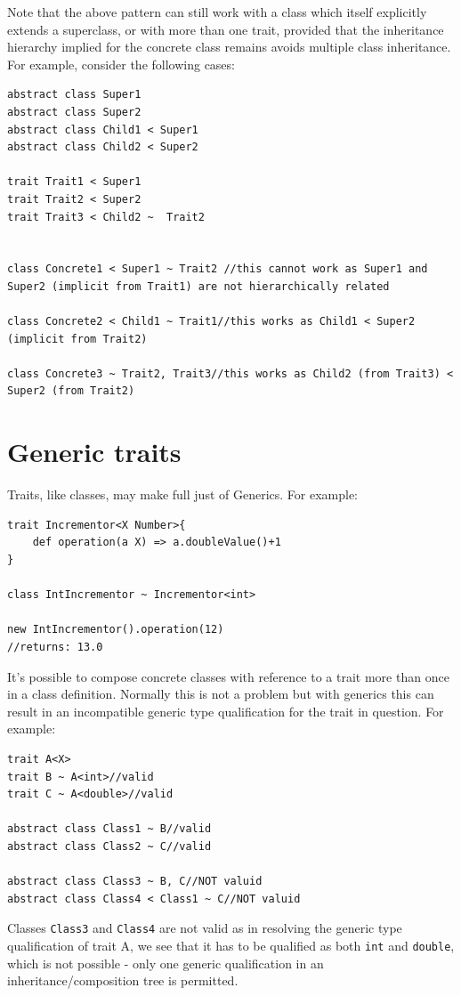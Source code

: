 \documentclass[conc-doc]{subfiles}
\begin{document}
Note that the above pattern can still work with a class which itself explicitly extends a superclass, or with more than one trait, provided that the inheritance hierarchy implied for the concrete class remains avoids multiple class inheritance. For example, consider the following cases:
\begin{lstlisting}
abstract class Super1
abstract class Super2
abstract class Child1 < Super1
abstract class Child2 < Super2

trait Trait1 < Super1
trait Trait2 < Super2
trait Trait3 < Child2 ~  Trait2


class Concrete1 < Super1 ~ Trait2 //this cannot work as Super1 and Super2 (implicit from Trait1) are not hierarchically related 

class Concrete2 < Child1 ~ Trait1//this works as Child1 < Super2 (implicit from Trait2)

class Concrete3 ~ Trait2, Trait3//this works as Child2 (from Trait3) < Super2 (from Trait2) 
\end{lstlisting}

\section{Generic traits}
Traits, like classes, may make full just of Generics. For example:
\begin{lstlisting}
trait Incrementor<X Number>{
	def operation(a X) => a.doubleValue()+1
}

class IntIncrementor ~ Incrementor<int>

new IntIncrementor().operation(12)
//returns: 13.0
\end{lstlisting}

It's possible to compose concrete classes with reference to a trait more than once in a class definition. Normally this is not a problem but with generics this can result in an incompatible generic type qualification for the trait in question. For example:
\begin{lstlisting}
trait A<X>
trait B ~ A<int>//valid
trait C ~ A<double>//valid

abstract class Class1 ~ B//valid
abstract class Class2 ~ C//valid

abstract class Class3 ~ B, C//NOT valuid
abstract class Class4 < Class1 ~ C//NOT valuid
\end{lstlisting}

Classes \lstinline{Class3} and \lstinline{Class4} are not valid as in resolving the generic type qualification of trait A, we see that it has to be qualified as both \lstinline{int} and \lstinline{double}, which is not possible - only one generic qualification in an inheritance/composition tree is permitted.
\end{document}

